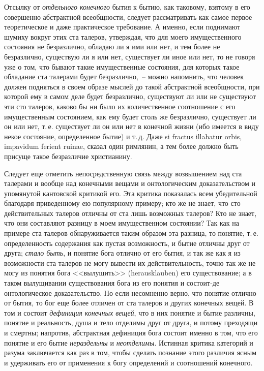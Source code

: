 Отсылку от \emph{отдельного конечного} бытия к бытию, как
таковому, взятому в его совершенно абстрактной всеобщности,
следует рассматривать как самое первое теоретическое
и даже практическое требование. А именно, если
поднимают шумиху вокруг этих ста талеров, утверждая,
что для моего имущественного состояния не безразлично,
обладаю ли я ими или нет, и тем более не безразлично,
существую ли я или нет, существует ли иное или нет, то
не говоря уже о том, что бывают такие имущественные
состояния, для которых такое обладание ста талерами будет
безразлично,~-- можно напомнить, что человек должен
подняться в своем образе мыслей до такой абстрактной
всеобщности, при которой ему в самом деле будет
безразлично, существуют ли или не существуют эти сто
талеров, каково бы ни было их количественное соотношение
с его имущественным состоянием, как ему будет
столь же безразлично, существует ли он или нет, т.\,е. существует
ли он или нет в конечной жизни (ибо имеется
в виду некое состояние, определенное бытие) и т.\,д. Даже
si fractus illabatur orbis, impavidum ferient ruinae\endnotemark{},
сказал один римлянин, а тем более должно быть присуще
такое безразличие христианину.


Следует еще отметить непосредственную связь между
возвышением над ста талерами и вообще над конечными
вещами и онтологическим доказательством и упомянутой
кантовской критикой его. Эта критика показалась всем
убедительной благодаря приведенному ею популярному
примеру; кто же не знает, что сто действительных талеров
отличны от ста лишь возможных талеров? Кто не
знает, что они составляют разницу в моем имущественном
состоянии? Так как на примере ста талеров обнаруживается
таким образом эта разница, то понятие, т.\,е.
определенность содержания как пустая возможность, и
бытие отличны друг от друга; \emph{стало быть}, и понятие бога
отлично от его бытия, и так же как я из возможности
ста талеров не могу вывести их действительность, точно
так же не могу из понятия бога <<вылущить>> (herausklauben)
его существование; а в таком вылущивании существования
бога из его понятия и состоит-де онтологическое
доказательство. Но если несомненно верно, что понятие
отлично от бытия, то бог еще более отличен от ста
талеров и других конечных вещей. В том и состоит \emph{дефиниция
конечных вещей}, что в них понятие и бытие различны,
понятие и реальность, душа и тело отделимы друг
от друга, и потому преходящи и смертны; напротив, абстрактная
дефиниция бога состоит именно в том, что его
понятие и его бытие \emph{нераздельны} и \emph{неотделимы}. Истинная
критика категорий и разума заключается как раз в
том, чтобы сделать познание этого различия ясным и
удерживать его от применения к богу определений и соотношений
конечного.


